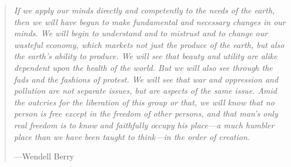 \vspace*{50 mm}

\small{}

\begin{quote}
	\emph{If we apply our minds directly and competently to the needs of the earth, 
	then we will have begun to make fundamental and necessary changes in our minds. 
	We will begin to understand and to mistrust and to change our wasteful economy, 
	which markets not just the produce of the earth, 
	but also the earth's ability to produce. 
	We will see that beauty and utility are alike dependent upon the health of the world. 
	But we will also see through the fads and the fashions of protest. 
	We will see that war and oppression and pollution are not separate issues, 
	but are aspects of the same issue. 
	Amid the outcries for the liberation of this group or that, 
	we will know that no person is free except in the freedom of other persons, 
	and that man's only real freedom 
	is to know and faithfully occupy his place---a much humbler place 
	than we have been taught to think---in the order of creation.}~\cite[p.~89]{Berry:2002aa}

	\hfill---Wendell Berry
\end{quote}

\normalsize{}

\clearpage{}








%
%


